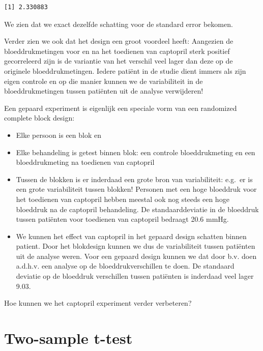 \documentclass[
  dutch,
  letterpaper,
  12pt]{book}
\theoremstyle{definition}
\theoremstyle{definition}
\theoremstyle{definition}
\theoremstyle{remark}
\begin{document}
\begin{verbatim}
[1] 2.330883
\end{verbatim}

We zien dat we exact dezelfde schatting voor de standard error bekomen.

Verder zien we ook dat het design een groot voordeel heeft: Aangezien de
bloeddrukmetingen voor en na het toedienen van captopril sterk positief
gecorreleerd zijn is de variantie van het verschil veel lager dan deze
op de originele bloeddrukmetingen. Iedere patiënt in de studie dient
immers als zijn eigen controle en op die manier kunnen we de
variabiliteit in de bloeddrukmetingen tussen patiënten uit de analyse
verwijderen!

Een gepaard experiment is eigenlijk een speciale vorm van een randomized
complete block design:

\begin{itemize}
\item
  Elke persoon is een blok en
\item
  Elke behandeling is getest binnen blok: een controle bloeddrukmeting
  en een bloeddrukmeting na toedienen van captopril
\item
  Tussen de blokken is er inderdaad een grote bron van variabiliteit:
  e.g.~er is een grote variabiliteit tussen blokken! Personen met een
  hoge bloeddruk voor het toedienen van captopril hebben meestal ook nog
  steeds een hoge bloeddruk na de captopril behandeling. De
  standaarddeviatie in de bloeddruk tussen patiënten voor toedienen van
  captopril bedraagt 20.6 mmHg.
\item
  We kunnen het effect van captopril in het gepaard design schatten
  binnen patient. Door het blokdesign kunnen we dus de variabiliteit
  tussen patiënten uit de analyse weren. Voor een gepaard design kunnen
  we dat door b.v. doen a.d.h.v. een analyse op de bloeddrukverschillen
  te doen. De standaard deviatie op de bloeddruk verschillen tussen
  patiënten is inderdaad veel lager 9.03.
\end{itemize}

Hoe kunnen we het captopril experiment verder verbeteren?

\section{Two-sample t-test}\label{two-sample-t-test}
\end{document}
